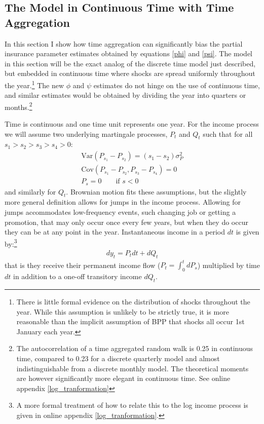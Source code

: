 \documentclass[AER]{AEA}
\begin{document}
\subsection{The Model in Continuous Time with Time Aggregation}
In this section I show how time aggregation can significantly bias the partial insurance parameter estimates obtained by equations \ref{phi} and \ref{psi}. The model in this section will be the exact analog of the discrete time model just described, but embedded in continuous time where shocks are spread uniformly throughout the year.\footnote{There is little formal evidence on the distribution of shocks throughout the year. While this assumption is unlikely to be strictly true, it is more reasonable than the implicit assumption of BPP that shocks all occur 1st January each year.} The new $\phi$ and $\psi$ estimates do not hinge on the use of continuous time, and similar estimates would be obtained by dividing the year into quarters or months.\footnote{The autocorrelation of a time aggregated random walk is 0.25 in continuous time, compared to 0.23 for a discrete quarterly model and almost indistinguishable from a discrete monthly model. The theoretical moments are however significantly more elegant in continuous time. See online appendix \ref{log_tranformation}}

Time is continuous and one time unit represents one year. For the income process we will assume two underlying martingale processes, $P_t$ and $Q_t$ such that for all $s_1>s_2>s_3>s_4>0$:
\begin{align*}
\mathrm{Var}(P_{s_1}-P_{s_2})=(s_1-s_2)\sigma_P^2 \\
\mathrm{Cov}(P_{s_1}-P_{s_2},P_{s_3}-P_{s_4}) = 0 \\
P_s = 0 \qquad \text{if } s<0
\end{align*}
and similarly for $Q_t$. Brownian motion fits these assumptions, but the slightly more general definition allows for jumps in the income process. Allowing for jumps accommodates low-frequency events, such changing job or getting a promotion, that may only occur once every few years, but when they do occur they can be at any point in the year. Instantaneous income in a period $dt$ is given by:\footnote{A more formal treatment of how to relate this to the log income process is given in online appendix \ref{log_tranformation}.}
\begin{align}
dy_t = P_t dt  +dQ_t \label{income_process}
\end{align}
that is they receive their permanent income flow ($P_t =\int_{0}^{t}dP_s $) multiplied by time $dt$ in addition to a one-off transitory income $dQ_t$.
\end{document}

